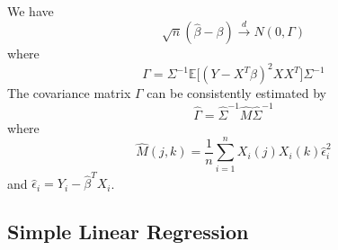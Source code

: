 \documentclass{article}
\begin{document}
      \begin{theorem}
        We have 
        \begin{equation}
          \sqrt{n} (\hat{\beta} - \beta) \xrightarrow{d} N(0, \Gamma) 
        \end{equation}
        where 
        \begin{equation}
          \Gamma = \Sigma^{-1} \mathbb{E} \big[ (Y - X^T \beta)^2 X X^T \big] \Sigma^{-1}
        \end{equation}
        The covariance matrix $\Gamma$ can be consistently estimated by 
        \begin{equation}
          \hat{\Gamma} = \hat{\Sigma}^{-1} \hat{M} \hat{\Sigma}^{-1}
        \end{equation}
        where 
        \begin{equation}
          \hat{M} (j, k) = \frac{1}{n} \sum_{i=1}^n X_i (j) X_i (k) \hat{\epsilon}_i^2
        \end{equation}
        and $\hat{\epsilon}_i = Y_i - \hat{\beta}^T X_i$.
      \end{theorem}

  \subsection{Simple Linear Regression}
\end{document}
